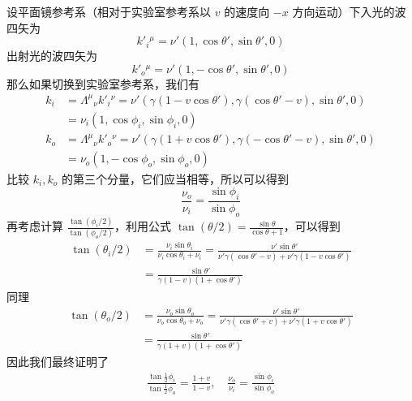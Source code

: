 设平面镜参考系（相对于实验室参考系以 $v$ 的速度向 $-x$ 方向运动）下入光的波四矢为
\begin{equation}
k'_i{}^\mu=\nu'(1,\cos\theta',\sin\theta',0)
\end{equation}
出射光的波四矢为
\begin{equation}
k'_o{}^\mu=\nu'(1,-\cos\theta',\sin\theta',0)
\end{equation}
那么如果切换到实验室参考系，我们有
\begin{equation}
\begin{aligned}
k_i&=\Lambda^\mu{}_\nu k'_i{}^\nu=\nu'(\gamma(1-v\cos\theta'),\gamma(\cos\theta'-v),\sin\theta',0)\\
&=\nu_i(1,\cos\phi_i,\sin\phi_i,0)\\
k_o&=\Lambda^\mu{}_\nu k'_o{}^\nu=\nu'(\gamma(1+v\cos\theta'),\gamma(-\cos\theta'-v),\sin\theta',0)\\
&=\nu_o(1,-\cos\phi_o,\sin\phi_o,0)
\end{aligned}
\end{equation}
比较 $k_i,k_o$ 的第三个分量，它们应当相等，所以可以得到
\begin{equation}
\frac{\nu_o}{\nu_i}=\frac{\sin\phi_i}{\sin\phi_o}
\end{equation}
再考虑计算 $\frac{\tan(\phi_i/2)}{\tan(\phi_o/2)}$，利用公式 $\tan(\theta/2)=\frac{\sin\theta}{\cos\theta+1}$，可以得到
\begin{equation}
\begin{aligned}
\tan(\theta_i/2)&=\frac{\nu_i\sin\theta_i}{\nu_i\cos\theta_i+\nu_i}=\frac{\nu'\sin\theta'}{\nu'\gamma(\cos\theta'-v)+\nu'\gamma(1-v\cos\theta')}\\
&=\frac{\sin\theta'}{\gamma(1-v)(1+\cos\theta')}
\end{aligned}
\end{equation}
同理
\begin{equation}
\begin{aligned}
\tan(\theta_o/2)&=\frac{\nu_o\sin\theta_o}{\nu_o\cos\theta_o+\nu_o}=\frac{\nu'\sin\theta'}{\nu'\gamma(\cos\theta'+v)+\nu'\gamma(1+v\cos\theta')}\\
&=\frac{\sin\theta'}{\gamma(1+v)(1+\cos\theta')}
\end{aligned}
\end{equation}
因此我们最终证明了
\begin{equation}
\begin{aligned}
	\frac{\tan\frac{1}{2}\phi_i}{\tan\frac{1}{2}\phi_o}=\frac{1+v}{1-v},\quad \frac{\nu_o}{\nu_i}=\frac{\sin\phi_i}{\sin\phi_o}
\end{aligned}
\end{equation}
